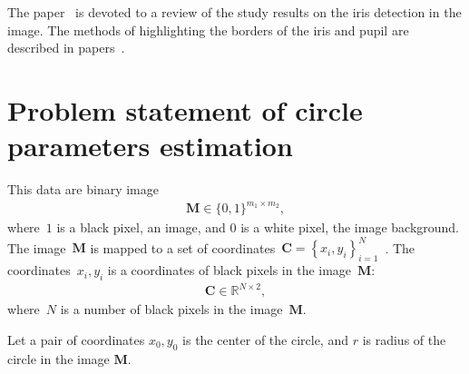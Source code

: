 \documentclass[12pt, twoside]{article}
\begin{document}
The paper~\cite{Bowyer2010} is devoted to a review of the study results on the iris detection in the image.
The methods of highlighting the borders of the iris and pupil are described in papers~\cite{Matveev2010, Matveev2014}.

\section{Problem statement of circle parameters estimation}
This data are binary image
\[
\label{eq:st:cr:1}
\begin{aligned}
\textbf{M} \in \{0,1\}^{m_1 \times m_2},
\end{aligned}
\]
where~$1$ is a black pixel, an image, and $0$ is a white pixel, the image background.
The image~$\textbf{M}$ is mapped to a set of coordinates~$\textbf{C}=\left\{x_i, y_i\right\}_{i=1}^{N}$~. The coordinates~$x_i, y_i$ is a coordinates of black pixels in the image~$\textbf{M}$:
\[
\label{eq:st:cr:2}
\begin{aligned}
\textbf{C} \in  \mathbb{R}^{N \times 2},
\end{aligned}
\]
where~$N$ is a number of black pixels in the image~$\textbf{M}$.

Let a pair of coordinates $x_0, y_0$ is the center of the circle, and $r$ is radius of the circle in the image $\textbf{M}$.
 
\end{document}
